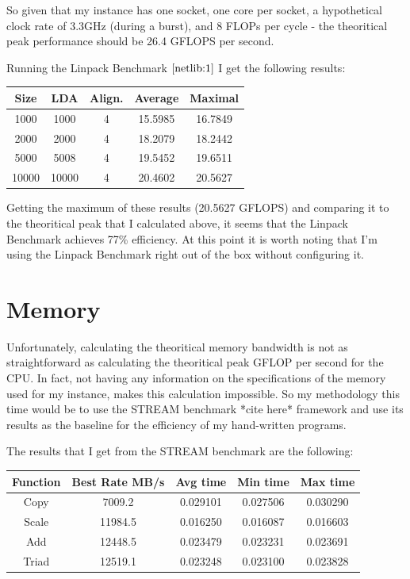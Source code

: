 \documentclass[12pt]{article}
\begin{document}
So given that my instance has one socket, one core per socket, a
hypothetical clock rate of 3.3GHz (during a burst), and 8 FLOPs
per cycle - the theoritical peak performance should be 26.4 GFLOPS
per second.

Running the Linpack Benchmark $\cite{netlib:1}$ I get the
following results:

\begin{center}
  \begin{tabular}{||c c c c c||} 
  \hline
  Size & LDA & Align. & Average & Maximal \\ [0.5ex] 
  \hline\hline
  1000 & 1000 & 4 & 15.5985 & 16.7849 \\ 
  \hline
  2000 & 2000 & 4 & 18.2079 & 18.2442 \\
  \hline
  5000 & 5008 & 4 & 19.5452 & 19.6511 \\
  \hline
  10000 & 10000 & 4 & 20.4602 & 20.5627 \\ [1ex] 
  \hline
  \end{tabular}
\end{center}

Getting the maximum of these results (20.5627 GFLOPS) and
comparing it to the theoritical peak that I calculated above,
it seems that the Linpack Benchmark achieves 77\% efficiency.
At this point it is worth noting that I'm using the Linpack
Benchmark right out of the box without configuring it.

\section{Memory}

Unfortunately, calculating the theoritical memory bandwidth
is not as straightforward as calculating the theoritical
peak GFLOP per second for the CPU. In fact, not having any
information on the specifications of the memory used for
my instance, makes this calculation impossible. So my
methodology this time would be to use the STREAM benchmark *cite here*
framework and use its results as the baseline for the
efficiency of my hand-written programs.

The results that I get from the STREAM benchmark are the
following:



\begin{tabular}{ |c||c|c|c|c|  }
  \hline
  Function & Best Rate MB/s & Avg time & Min time & Max time\\
  \hline
  Copy & 7009.2 & 0.029101 & 0.027506 & 0.030290\\
  Scale & 11984.5 & 0.016250 & 0.016087 & 0.016603\\
  Add & 12448.5 & 0.023479 & 0.023231 & 0.023691\\
  Triad & 12519.1 & 0.023248 & 0.023100 & 0.023828\\
  \hline
\end{tabular}
\end{document}

